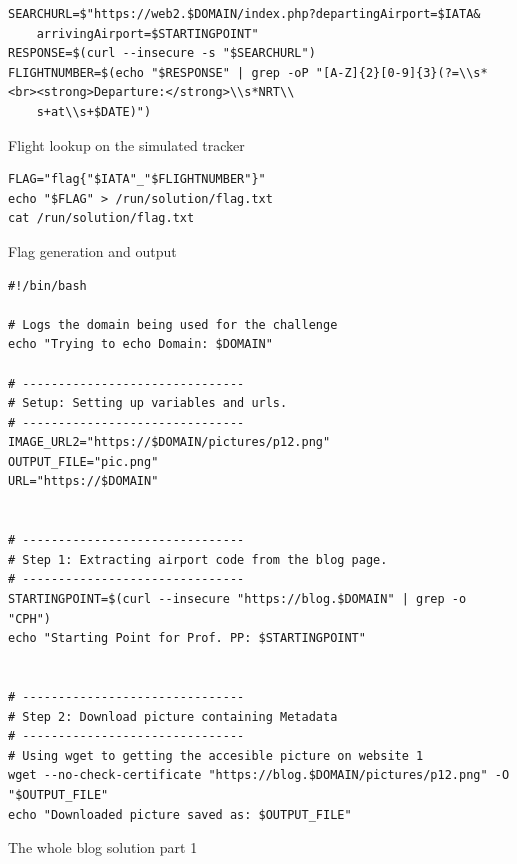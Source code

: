 \begin{verbatim}
SEARCHURL=$"https://web2.$DOMAIN/index.php?departingAirport=$IATA&
    arrivingAirport=$STARTINGPOINT"
RESPONSE=$(curl --insecure -s "$SEARCHURL")
FLIGHTNUMBER=$(echo "$RESPONSE" | grep -oP "[A-Z]{2}[0-9]{3}(?=\\s*<br><strong>Departure:</strong>\\s*NRT\\
    s+at\\s+$DATE)")
\end{verbatim}
\begin{listing}[H]
\caption{Flight lookup on the simulated tracker}
\end{listing}

\begin{verbatim}
FLAG="flag{"$IATA"_"$FLIGHTNUMBER"}"
echo "$FLAG" > /run/solution/flag.txt
cat /run/solution/flag.txt
\end{verbatim}
\begin{listing}[H]
\caption{Flag generation and output}
\end{listing}

\begin{verbatim}
#!/bin/bash

# Logs the domain being used for the challenge
echo "Trying to echo Domain: $DOMAIN"

# -------------------------------
# Setup: Setting up variables and urls.
# -------------------------------
IMAGE_URL2="https://$DOMAIN/pictures/p12.png"
OUTPUT_FILE="pic.png"                                                                                                   
URL="https://$DOMAIN"


# -------------------------------
# Step 1: Extracting airport code from the blog page.
# -------------------------------
STARTINGPOINT=$(curl --insecure "https://blog.$DOMAIN" | grep -o "CPH")
echo "Starting Point for Prof. PP: $STARTINGPOINT"


# -------------------------------
# Step 2: Download picture containing Metadata
# -------------------------------
# Using wget to getting the accesible picture on website 1  
wget --no-check-certificate "https://blog.$DOMAIN/pictures/p12.png" -O "$OUTPUT_FILE"
echo "Downloaded picture saved as: $OUTPUT_FILE"

\end{verbatim}
\begin{listing}[H]
\caption{The whole blog solution part 1}
\end{listing}

